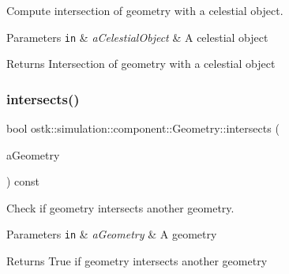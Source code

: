 Compute intersection of geometry with a celestial object. 


\begin{DoxyParams}[1]{Parameters}
\mbox{\tt in}  & {\em a\+Celestial\+Object} & A celestial object \\
\hline
\end{DoxyParams}
\begin{DoxyReturn}{Returns}
Intersection of geometry with a celestial object 
\end{DoxyReturn}
\mbox{\label{classostk_1_1simulation_1_1component_1_1_geometry_aeec7b3694e1ca2552b65c56de9acc315}} 
\subsubsection{\texorpdfstring{intersects()}{intersects()}\hspace{0.1cm}{\footnotesize\ttfamily [1/2]}}
{\footnotesize\ttfamily bool ostk\+::simulation\+::component\+::\+Geometry\+::intersects (\begin{DoxyParamCaption}\item[{const \hyperlink{namespaceostk_1_1simulation_1_1component_a911837ab7e6f8471e9927a74795a0077}{Object\+Geometry} \&}]{a\+Geometry }\end{DoxyParamCaption}) const}



Check if geometry intersects another geometry. 


\begin{DoxyParams}[1]{Parameters}
\mbox{\tt in}  & {\em a\+Geometry} & A geometry \\
\hline
\end{DoxyParams}
\begin{DoxyReturn}{Returns}
True if geometry intersects another geometry 
\end{DoxyReturn}
\mbox{\label{classostk_1_1simulation_1_1component_1_1_geometry_a954a8a7af85cde7d9407b98ac9dd23c5}} 
